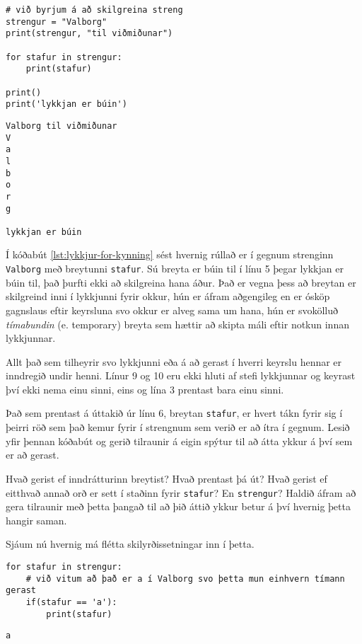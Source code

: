 \newpage {}

\begin{lstlisting}[caption=For lykkjur kynntar, label=lst:lykkjur-for-kynning]
# við byrjum á að skilgreina streng
strengur = "Valborg"
print(strengur, "til viðmiðunar")

for stafur in strengur:
	print(stafur)
	
print()
print('lykkjan er búin')
\end{lstlisting}
\lstset{style=uttak}
\begin{lstlisting}
Valborg til viðmiðunar
V
a
l
b
o
r
g

lykkjan er búin
\end{lstlisting}

Í kóðabút \ref{lst:lykkjur-for-kynning} sést hvernig rúllað er í gegnum strenginn \texttt{Valborg} með breytunni \texttt{stafur}.
Sú breyta er búin til í línu 5 þegar lykkjan er búin til, það þurfti ekki að skilgreina hana áður.
Það er vegna þess að breytan er skilgreind inni í lykkjunni fyrir okkur, hún er áfram aðgengileg en er ósköp gagnslaus eftir keyrsluna svo okkur er alveg sama um hana, hún er svokölluð \emph{tímabundin} (e. temporary) breyta sem hættir að skipta máli eftir notkun innan lykkjunnar.

Allt það sem tilheyrir svo lykkjunni eða á að gerast í hverri keyrslu hennar er inndregið undir henni.
Línur 9 og 10 eru ekki hluti af stefi lykkjunnar og keyrast því ekki nema einu sinni, eins og lína 3 prentast bara einu sinni.

Það sem prentast á úttakið úr línu 6, breytan \texttt{stafur}, er hvert tákn fyrir sig í þeirri röð sem það kemur fyrir í strengnum sem verið er að ítra í gegnum.
Lesið yfir þennan kóðabút og gerið tilraunir á eigin spýtur til að átta ykkur á því sem er að gerast.

Hvað gerist ef inndrátturinn breytist?
Hvað prentast þá út?
Hvað gerist ef eitthvað annað orð er sett í staðinn fyrir \texttt{stafur}?
En \texttt{strengur}?
Haldið áfram að gera tilraunir með þetta þangað til að þið áttið ykkur betur á því hvernig þetta hangir saman.

Sjáum nú hvernig má flétta skilyrðissetningar inn í þetta.

\lstset{style=venjulegt}
\begin{lstlisting}[caption=For lykkja og skilyrðissetningar, label=lst:lykkjur-for-skil]
for stafur in strengur:
	# við vitum að það er a í Valborg svo þetta mun einhvern tímann gerast
	if(stafur == 'a'):
		print(stafur)
\end{lstlisting}
\lstset{style=uttak}
\begin{lstlisting}
a
\end{lstlisting}

